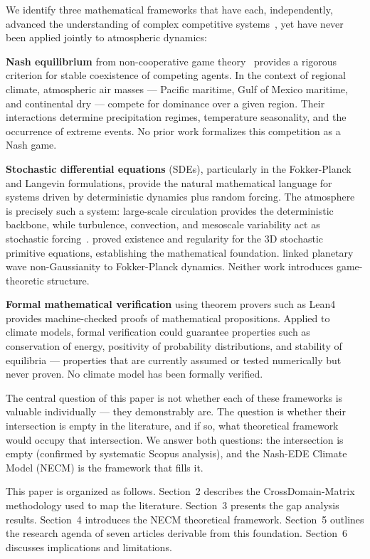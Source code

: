 \documentclass[12pt,a4paper]{article}
\begin{document}
We identify three mathematical frameworks that have each, independently,
advanced the understanding of complex competitive systems~\citep{Ghil2002}, yet have never
been applied jointly to atmospheric dynamics:

\textbf{Nash equilibrium} from non-cooperative game theory~\citep{Osborne1994, Fudenberg1991} provides a
rigorous criterion for stable coexistence of competing agents. In the
context of regional climate, atmospheric air masses — Pacific maritime,
Gulf of Mexico maritime, and continental dry — compete for dominance
over a given region. Their interactions determine precipitation regimes,
temperature seasonality, and the occurrence of extreme events. No prior
work formalizes this competition as a Nash game.

\textbf{Stochastic differential equations} (SDEs), particularly in the
Fokker-Planck and Langevin formulations, provide the natural mathematical
language for systems driven by deterministic dynamics plus random
forcing. The atmosphere is precisely such a system: large-scale
circulation provides the deterministic backbone, while turbulence,
convection, and mesoscale variability act as stochastic forcing~\citep{Frankignoul2012}.
\citet{Debussche2012} proved existence and regularity for the 3D
stochastic primitive equations, establishing the mathematical foundation.
\citet{Majda2006} linked planetary wave non-Gaussianity to Fokker-Planck
dynamics. Neither work introduces game-theoretic structure.

\textbf{Formal mathematical verification} using theorem provers such as
Lean4~\citep{LeanFour2021, Mathlib2020} provides machine-checked proofs of mathematical
propositions. Applied to climate models, formal verification could
guarantee properties such as conservation of energy, positivity of
probability distributions, and stability of equilibria — properties
that are currently assumed or tested numerically but never proven.
No climate model has been formally verified.

The central question of this paper is not whether each of these
frameworks is valuable individually — they demonstrably are. The question
is whether their intersection is empty in the literature, and if so,
what theoretical framework would occupy that intersection. We answer
both questions: the intersection is empty (confirmed by systematic
Scopus analysis), and the Nash-EDE Climate Model (NECM) is the
framework that fills it.

This paper is organized as follows. Section~2 describes the CrossDomain-Matrix
methodology used to map the literature. Section~3 presents the gap
analysis results. Section~4 introduces the NECM theoretical framework.
Section~5 outlines the research agenda of seven articles derivable from
this foundation. Section~6 discusses implications and limitations.
\end{document}

